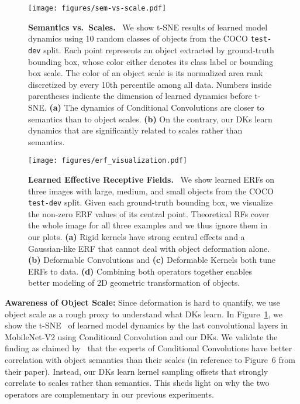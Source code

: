 \documentclass{article} \usepackage{iclr2020_conference, times}
\newcommand{\bfsection}[1]{\noindent\textbf{#1:}}
\newcommand{\captiont}[2]{\caption{\textbf{#1} #2}}
\begin{document}
\begin{figure}[t]
    \centering
    \texttt{[image: figures/sem-vs-scale.pdf]}
    \captiont{Semantics vs.\ Scales.}{\
        We show t-SNE results of learned model dynamics using 10 random classes
        of objects from the COCO \texttt{test-dev} split.
        Each point represents an object extracted by ground-truth bounding box,
        whose color either denotes its class label or bounding box
        scale.
        The color of an object scale is its normalized area rank discretized by
        every 10th percentile among all data.
        Numbers inside parentheses indicate the dimension of learned
        dynamics before t-SNE.
        \textbf{(a)}
        The dynamics of Conditional Convolutions are closer to semantics than
        to object scales.
        \textbf{(b)}
        On the contrary, our DKs learn dynamics that are significantly related
        to scales rather than semantics.
    }\vspace{-0.5em}
    \label{fig:sem-vs-scale}
\end{figure}

\begin{figure}[t]
    \centering
    \texttt{[image: figures/erf\_visualization.pdf]}
    \captiont{Learned Effective Receptive Fields.}{\
        We show learned ERFs on three images with \textcolor{large}{large},
        \textcolor{medium}{medium}, and \textcolor{small}{small} objects from
        the COCO \texttt{test-dev} split.
        Given each ground-truth bounding box, we visualize the non-zero ERF
        values of its central point.
        Theoretical RFs cover the whole image for all three examples and we
        thus ignore them in our plots.
        \textbf{(a)} Rigid kernels have strong central effects and a
        Gaussian-like ERF that cannot deal with object deformation alone.
        \textbf{(b)} Deformable Convolutions and \textbf{(c)} Deformable Kernels
        both tune ERFs to data.
        \textbf{(d)} Combining both operators together enables better
        modeling of 2D geometric transformation of objects.
    }\vspace{-0.5em}
    \label{fig:erf_visualization}
\end{figure}

\bfsection{Awareness of Object Scale}
Since deformation is hard to quantify, we use object scale as a rough
proxy to understand what DKs learn.
In Figure~\ref{fig:sem-vs-scale}, we show the
t-SNE~\citep{maaten2008visualizing} of learned model dynamics by the last
convolutional layers in MobileNet-V2 using Conditional Convolution and our DKs.
We validate the finding as claimed by~\citet{yang2019soft} that the experts of
Conditional Convolutions have better correlation with object semantics than
their scales (in reference to Figure~6 from their paper).
Instead, our DKs learn kernel sampling offsets that strongly correlate to
scales rather than semantics.
This sheds light on why the two operators are complementary in our previous
experiments.
\end{document}
